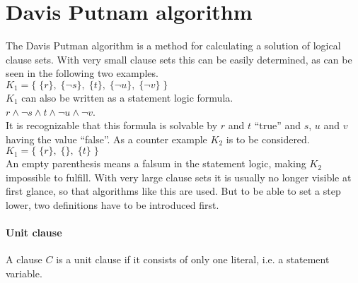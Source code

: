 \section{Davis Putnam algorithm}
The Davis Putman algorithm is a method for calculating a solution of logical clause sets. With very small clause sets this can be easily determined, as can be seen in the following two examples.
\\
\hspace*{1.3cm} 
$K_1 = \bigl\{\; \{r\},\; \{\neg s\},\; \{t\},\; \{\neg u\}, \; \{\neg v\} \;\bigr\}$ 
\\[0.2cm]
$K_1$ %
can also be written as a statement logic formula.
\\[0.2cm]
\hspace*{1.3cm}
$r \wedge \neg s \wedge t \wedge \neg u \wedge \neg v$.
\\[0.2cm]
It is recognizable that this formula is solvable by $r$ and $t$ \enquote{true} and $s$, $u$ and $v$ having the value \enquote{false}.
As a counter example $K_2$ is to be considered.
\hspace*{1.3cm}
$K_1 = \bigl\{\; \{r\},\; \{\},\; \{t\} \;\bigr\}$ 
\\[0.2cm]
An empty parenthesis means a falsum in the statement logic, making $K_2$ impossible to fulfill.
With very large clause sets it is usually no longer visible at first glance, so that algorithms like this are used. But to be able to set a step lower, two definitions have to be introduced first.
\paragraph{Unit clause} %
A clause $C$ is a unit clause if it consists of only one literal, i.e. a statement variable.
